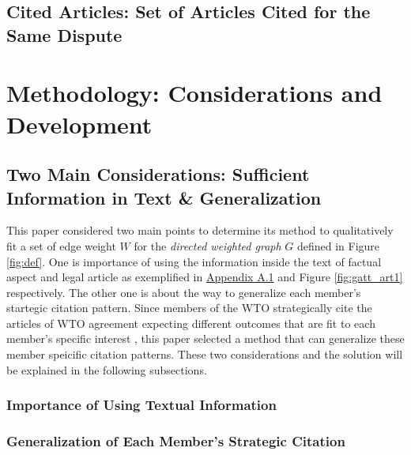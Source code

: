 \documentclass[12pt,letterpaper]{article}
\begin{document}
\subsection{Cited Articles: Set of Articles Cited for the Same Dispute}


\section{Methodology: Considerations and Development}


\subsection{Two Main Considerations: Sufficient Information in Text \& Generalization} \label{justification-nn}
This paper considered two main points to
determine its method to qualitatively fit a set of edge weight $W$ for the \textit{directed weighted graph} $G$ defined in Figure \ref{fig:def}. 
One is importance of using the information inside the text of factual aspect and legal article as exemplified in \hyperref[sub:factual-aspect-example]{Appendix A.1} and Figure {\ref{fig:gatt_art1}} respectively. The other one is about the way to generalize each member's startegic citation pattern. Since members of the WTO strategically cite
the articles of WTO agreement expecting different outcomes that are fit to each member's specific interest \citep{who_gets, pelc, latent}, this paper
selected a method that can generalize these member speicific citation patterns. These two considerations and the solution will be explained in the following subsections.


\subsubsection{Importance of Using Textual Information}


\subsubsection{Generalization of Each Member's Strategic Citation}
\end{document}
